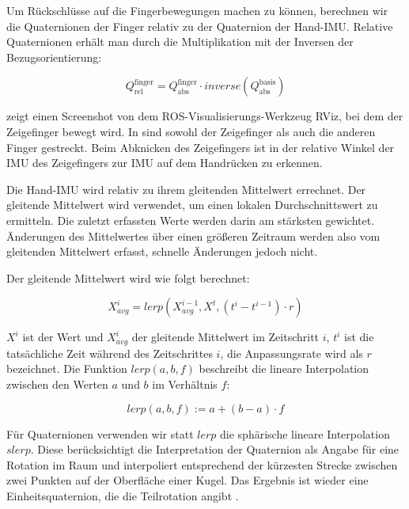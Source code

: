 Um Rückschlüsse auf die Fingerbewegungen machen zu können, berechnen wir die Quaternionen der Finger relativ zu der Quaternion der Hand-IMU. Relative Quaternionen erhält man durch die Multiplikation mit der Inversen der Bezugsorientierung:

$$Q_{\text{rel}}^{\text{finger}} =  Q_{\text{abs}}^{\text{finger}} \cdot inverse(Q_{\text{abs}}^{\text{basis}})$$

 zeigt einen Screenshot von dem ROS-Visualisierungs-Werkzeug RViz, bei dem der Zeigefinger bewegt wird.
In  sind sowohl der Zeigefinger als auch die anderen Finger gestreckt.
Beim Abknicken des Zeigefingers ist in  der relative Winkel der IMU des Zeigefingers zur IMU auf dem Handrücken zu erkennen.

Die Hand-IMU wird relativ zu ihrem gleitenden Mittelwert errechnet. Der gleitende Mittelwert wird verwendet, um einen lokalen Durchschnittswert zu ermitteln. Die zuletzt erfassten Werte werden darin am stärksten gewichtet. Änderungen des Mittelwertes über einen größeren Zeitraum werden also vom gleitenden Mittelwert erfasst, schnelle Änderungen jedoch nicht.

Der gleitende Mittelwert wird wie folgt berechnet:

$$X_{avg}^i = lerp\left(X_{avg}^{i-1}, X^t, \left(t^{i} - t^{i-1}\right) \cdot r\right)$$

$X^i$ ist der Wert und $X_{avg}^i$ der gleitende Mittelwert im
Zeitschritt $i$, $t^i$ ist die tatsächliche Zeit während des  Zeitschrittes $i$, die Anpassungsrate wird als $r$ bezeichnet. Die Funktion $lerp(a, b, f)$ beschreibt die lineare
Interpolation zwischen den Werten $a$ und $b$ im Verhältnis $f$:

$$lerp(a, b, f) := a + (b - a) \cdot f$$

Für Quaternionen verwenden wir statt $lerp$ die sphärische lineare Interpolation $slerp$. Diese berücksichtigt die Interpretation der Quaternion als Angabe für eine Rotation im Raum und interpoliert entsprechend der kürzesten Strecke zwischen zwei Punkten auf der Oberfläche einer Kugel. Das Ergebnis ist wieder eine Einheitsquaternion, die die Teilrotation angibt \citep{spherical_interpolation}.

